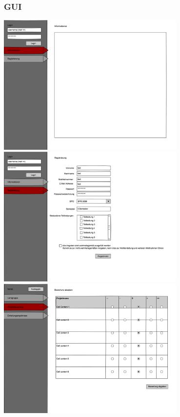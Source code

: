 \documentclass[parskip=full]{scrartcl}
\begin{document}
\begin{enumerate}
\subsubsection{GUI}
{\centering
\includegraphics[width=0.7\textwidth, height=0.4\textheight]{gui/index.png}
\medskip
\includegraphics[width=0.7\textwidth,
height=0.4\textheight]{gui/registrierung.png}
\medskip
\includegraphics[width=0.7\textwidth,
height=0.4\textheight]{gui/studentbewertung.png}
\medskip
}
\end{enumerate}
\end{document}
